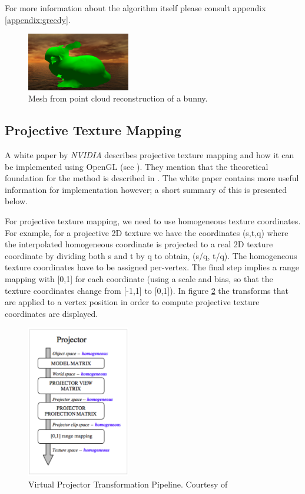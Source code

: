 \documentclass[]{article}
\begin{document}
For more information about the algorithm itself please consult appendix \ref{appendix:greedy}.

 
\begin{figure}[hbtp]
    \centering
    \includegraphics[width=0.4\textwidth]{figures/reconstructedBunny.png}
    \caption{Mesh from point cloud reconstruction of a bunny.}
    \label{fig:ReconstructedBunny}
\end{figure}

\subsection{Projective Texture Mapping}
\label{sec:ptm}

A white paper by \textit{NVIDIA} describes projective texture mapping and how it can be implemented using OpenGL (see \cite{cassNvidia}). They mention that the theoretical foundation for the method is described in \cite{segal92}. The white paper contains more useful information for implementation however; a short summary of this is presented below.

For projective texture mapping, we need to use homogeneous texture coordinates. For example, for a projective 2D texture we have the coordinates (s,t,q) where the interpolated homogeneous coordinate is projected to a real 2D texture coordinate by dividing both s and t by q to obtain, (s/q, t/q). The homogeneous texture coordinates have to be assigned per-vertex. The final step implies a range mapping with [0,1] for each coordinate (using a scale and bias, so that the texture coordinates change from [-1,1] to [0,1]). In figure \ref{fig:VirtualProjectorPipeline} the transforms that are applied to a vertex position in order to compute projective texture coordinates are displayed.

\begin{figure}[hbtp]
    \centering
    \includegraphics[width=0.4\textwidth]{figures/VirtualProjectorPipeline.PNG}
    \caption{Virtual Projector Transformation Pipeline. Courtesy of \cite{cassNvidia}}
    \label{fig:VirtualProjectorPipeline}
\end{figure}
\end{document}
